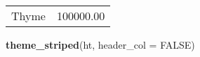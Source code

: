 \documentclass[]{article}
\newenvironment{Shaded}{\begin{snugshade}}{\end{snugshade}}
\newcommand{\KeywordTok}[1]{\textcolor[rgb]{0.13,0.29,0.53}{\textbf{{#1}}}}
\newcommand{\DataTypeTok}[1]{\textcolor[rgb]{0.13,0.29,0.53}{{#1}}}
\newcommand{\OtherTok}[1]{\textcolor[rgb]{0.56,0.35,0.01}{{#1}}}
\newcommand{\NormalTok}[1]{{#1}}
\begin{document}
\begin{table}[h]
\begin{centering}
\begin{tabularx}{0.5\textwidth}{p{} p{}}
\multicolumn{1}{p{0.25\textwidth}|}{\raggedright\rule{0pt}{\baselineskip+4pt}\hspace*{4pt}Thyme\hspace*{4pt}\rule[-4pt]{0pt}{4pt}} & \multicolumn{1}{p{0.25\textwidth}}{\raggedright\rule{0pt}{\baselineskip+4pt}\hspace*{4pt}100000.00\hspace*{4pt}\rule[-4pt]{0pt}{4pt}} \tabularnewline[-0.5pt]
\end{tabularx}
\par\end{centering}
\end{table}

\FloatBarrier

\begin{Shaded}
\begin{Highlighting}[]
\KeywordTok{theme_striped}\NormalTok{(ht, }\DataTypeTok{header_col =} \OtherTok{FALSE}\NormalTok{)}
\end{Highlighting}
\end{Shaded}
\end{document}
